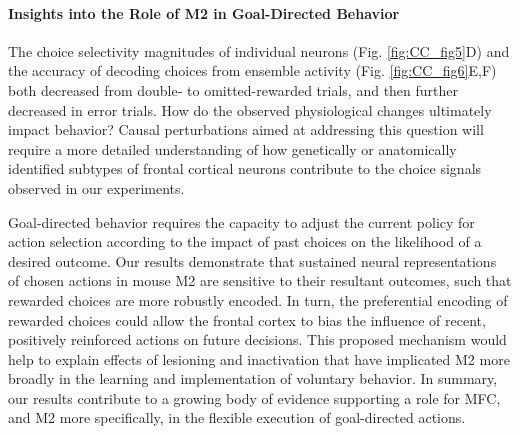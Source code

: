 \paragraph{Insights into the Role of M2 in Goal-Directed Behavior}
The choice selectivity magnitudes of individual neurons (Fig. \ref{fig:CC_fig5}D) and the accuracy of decoding choices from ensemble activity (Fig. \ref{fig:CC_fig6}E,F) both decreased from double- to omitted-rewarded trials, and then further decreased in error trials. How do the observed physiological changes ultimately impact behavior? Causal perturbations aimed at addressing this question will require a more detailed understanding of how genetically \citep{kvitsiani2013distinct, pinto2015cell, kamigaki2017delay} or anatomically identified subtypes of frontal cortical neurons \citep{li2015motor, chen2017map, otis2017prefrontal} contribute to the choice signals observed in our experiments.

Goal-directed behavior requires the capacity to adjust the current policy for action selection according to the impact of past choices on the likelihood of a desired outcome. Our results demonstrate that sustained neural representations of chosen actions in mouse M2 are sensitive to their resultant outcomes, such that rewarded choices are more robustly encoded. In turn, the preferential encoding of rewarded choices could allow the frontal cortex to bias the influence of recent, positively reinforced actions on future decisions. This proposed mechanism would help to explain effects of lesioning \citep{passingham1988premotor, gremel2013premotor} and inactivation \citep{siniscalchi2016fast, makino2017transformation} that have implicated M2 more broadly in the learning and implementation of voluntary behavior. In summary, our results contribute to a growing body of evidence supporting a role for MFC, and M2 more specifically, in the flexible execution of goal-directed actions.